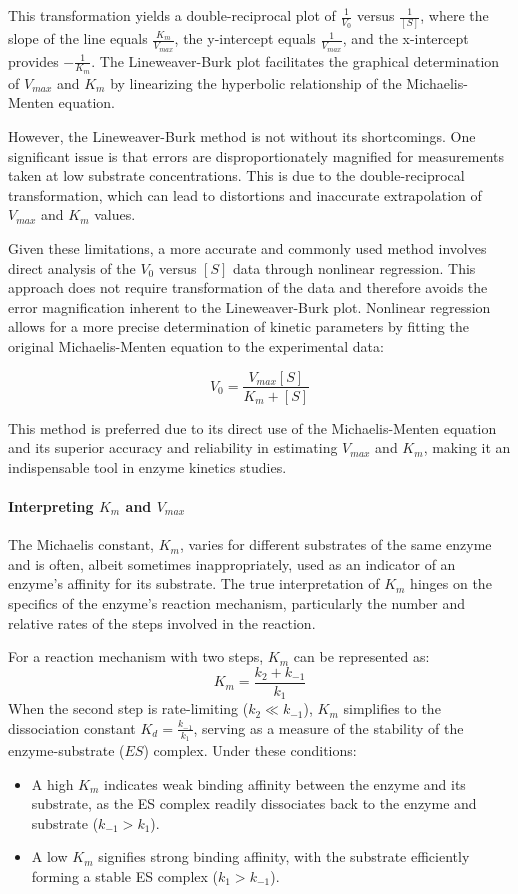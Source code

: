 This transformation yields a double-reciprocal plot of $\frac{1}{V_0}$ versus $\frac{1}{[S]}$, where 
the slope of the line equals $\frac{K_m}{V_{max}}$, the y-intercept equals $\frac{1}{V_{max}}$, and 
the x-intercept provides $-\frac{1}{K_m}$. The Lineweaver-Burk plot facilitates the graphical 
determination of $V_{max}$ and $K_m$ by linearizing the hyperbolic relationship of the Michaelis-Menten 
equation.

However, the Lineweaver-Burk method is not without its shortcomings. One significant issue is that 
errors are disproportionately magnified for measurements taken at low substrate concentrations. 
This is due to the double-reciprocal transformation, which can lead to distortions and inaccurate 
extrapolation of $V_{max}$ and $K_m$ values. 

Given these limitations, a more accurate and commonly used method involves direct analysis of 
the $V_0$ versus $[S]$ data through nonlinear regression. This approach does not require 
transformation of the data and therefore avoids the error magnification inherent to the Lineweaver-Burk 
plot. Nonlinear regression allows for a more precise determination of kinetic parameters by fitting 
the original Michaelis-Menten equation to the experimental data:

$$
V_0 = \frac{V_{max}[S]}{K_m + [S]}
$$

This method is preferred due to its direct use of the Michaelis-Menten equation and its superior 
accuracy and reliability in estimating $V_{max}$ and $K_m$, making it an indispensable tool in 
enzyme kinetics studies.

\paragraph{Interpreting \(K_m\) and \(V_{max}\)}

The Michaelis constant, $K_m$, varies for different substrates of the same enzyme and is often, 
albeit sometimes inappropriately, used as an indicator of an enzyme's affinity for its substrate. 
The true interpretation of $K_m$ hinges on the specifics of the enzyme's reaction mechanism, 
particularly the number and relative rates of the steps involved in the reaction.

For a reaction mechanism with two steps, $K_m$ can be represented as:
$$
K_m = \frac{k_2 + k_{-1}}{k_1}
$$
When the second step is rate-limiting ($k_2 \ll k_{-1}$), $K_m$ simplifies to the dissociation 
constant $K_d = \frac{k_{-1}}{k_1}$, serving as a measure of the stability of the enzyme-substrate 
($ES$) complex. Under these conditions:
\begin{itemize}
    \item A high $K_m$ indicates weak binding affinity between the enzyme and its substrate, 
    as the ES complex readily dissociates back to the enzyme and substrate ($k_{-1} > k_1$).
    \item A low $K_m$ signifies strong binding affinity, with the substrate efficiently 
    forming a stable ES complex ($k_1 > k_{-1}$).
\end{itemize}

